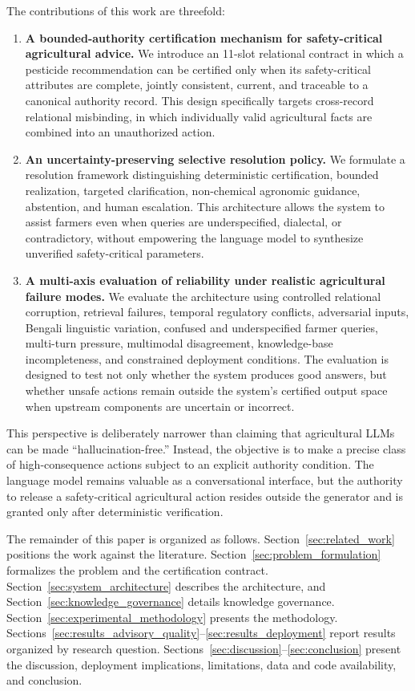 \documentclass[a4paper,fleqn]{cas-dc}
\begin{document}
The contributions of this work are threefold:
\begin{enumerate}
\item \textbf{A bounded-authority certification mechanism for safety-critical agricultural advice.} We introduce an 11-slot relational contract in which a pesticide recommendation can be certified only when its safety-critical attributes are complete, jointly consistent, current, and traceable to a canonical authority record. This design specifically targets cross-record relational misbinding, in which individually valid agricultural facts are combined into an unauthorized action.
\item \textbf{An uncertainty-preserving selective resolution policy.} We formulate a resolution framework distinguishing deterministic certification, bounded realization, targeted clarification, non-chemical agronomic guidance, abstention, and human escalation. This architecture allows the system to assist farmers even when queries are underspecified, dialectal, or contradictory, without empowering the language model to synthesize unverified safety-critical parameters.
\item \textbf{A multi-axis evaluation of reliability under realistic agricultural failure modes.} We evaluate the architecture using controlled relational corruption, retrieval failures, temporal regulatory conflicts, adversarial inputs, Bengali linguistic variation, confused and underspecified farmer queries, multi-turn pressure, multimodal disagreement, knowledge-base incompleteness, and constrained deployment conditions. The evaluation is designed to test not only whether the system produces good answers, but whether unsafe actions remain outside the system's certified output space when upstream components are uncertain or incorrect.
\end{enumerate}

This perspective is deliberately narrower than claiming that agricultural LLMs can be made ``hallucination-free.'' Instead, the objective is to make a precise class of high-consequence actions subject to an explicit authority condition. The language model remains valuable as a conversational interface, but the authority to release a safety-critical agricultural action resides outside the generator and is granted only after deterministic verification.

The remainder of this paper is organized as follows. Section~\ref{sec:related_work} positions the work against the literature. Section~\ref{sec:problem_formulation} formalizes the problem and the certification contract. Section~\ref{sec:system_architecture} describes the architecture, and Section~\ref{sec:knowledge_governance} details knowledge governance. Section~\ref{sec:experimental_methodology} presents the methodology. Sections~\ref{sec:results_advisory_quality}--\ref{sec:results_deployment} report results organized by research question. Sections~\ref{sec:discussion}--\ref{sec:conclusion} present the discussion, deployment implications, limitations, data and code availability, and conclusion.
\end{document}
